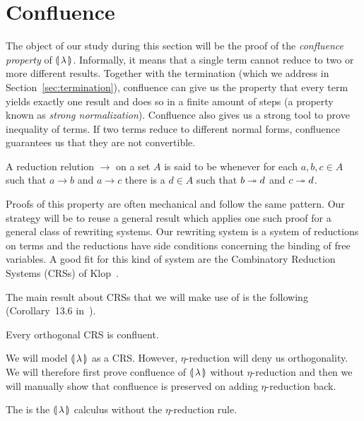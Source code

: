 \section{Confluence}
\label{sec:confluence}

The object of our study during this section will be the proof of the
\emph{confluence property} of $\llparenthesis \, \lambda \, \rrparenthesis$. Informally, it means that
a single term cannot reduce to two or more different results. Together with
the termination (which we address in Section~\ref{sec:termination}),
confluence can give us the property that every term yields exactly one
result and does so in a finite amount of steps (a property known as
\emph{strong normalization}). Confluence also gives us a strong tool to
prove inequality of terms. If two terms reduce to different normal forms,
confluence guarantees us that they are not convertible.

\begin{definition}
  A reduction relution $\to$ on a set $A$ is said to be 
  whenever for each $a,b,c \in A$ such that $a \to b$ and $a \to c$ there
  is a $d \in A$ such that $b \twoheadrightarrow d$ and $c \twoheadrightarrow d$.
\end{definition}

Proofs of this property are often mechanical and follow the same
pattern. Our strategy will be to reuse a general result which applies one
such proof for a general class of rewriting systems. Our rewriting system
is a system of reductions on terms and the reductions have side conditions
concerning the binding of free variables. A good fit for this kind of
system are the Combinatory Reduction Systems (CRSs) of
Klop~\cite{klop1993combinatory}.

The main result about CRSs that we will make use of is the following
(Corollary~13.6 in~\cite{klop1993combinatory}).

\begin{theorem}\label{thm:confluence-crs}

  Every orthogonal CRS is confluent.
\end{theorem}

We will model ${\llparenthesis \, \lambda \, \rrparenthesis}$ as a CRS. However, $\eta$-reduction will deny us
orthogonality. We will therefore first prove confluence of ${\llparenthesis \, \lambda \, \rrparenthesis}$ without
$\eta$-reduction and then we will manually show that confluence is
preserved on adding $\eta$-reduction back.

\begin{notation}
  The  is the
  $\llparenthesis \, \lambda \, \rrparenthesis$ calculus without the $\eta$-reduction rule.
\end{notation}

